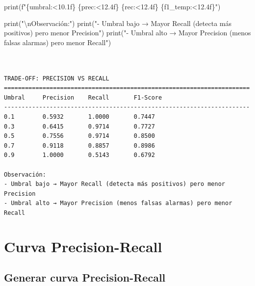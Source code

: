 \documentclass[
  doc,
  floatsintext,
  longtable,
  a4paper,
  nolmodern,
  notxfonts,
  notimes,
  12pt,
  colorlinks=true,linkcolor=blue,citecolor=blue,urlcolor=blue]{apa7}
\newenvironment{Shaded}{\begin{snugshade}}{\end{snugshade}}
\newcommand{\BuiltInTok}[1]{\textcolor[rgb]{0.00,0.23,0.31}{#1}}
\newcommand{\CharTok}[1]{\textcolor[rgb]{0.13,0.47,0.30}{#1}}
\newcommand{\NormalTok}[1]{\textcolor[rgb]{0.00,0.23,0.31}{#1}}
\newcommand{\SpecialCharTok}[1]{\textcolor[rgb]{0.37,0.37,0.37}{#1}}
\newcommand{\SpecialStringTok}[1]{\textcolor[rgb]{0.13,0.47,0.30}{#1}}
\newcommand{\StringTok}[1]{\textcolor[rgb]{0.13,0.47,0.30}{#1}}
\begin{document}
\begin{Shaded}
\begin{Highlighting}[]
    \BuiltInTok{print}\NormalTok{(}\SpecialStringTok{f"}\SpecialCharTok{\{}\NormalTok{umbral}\SpecialCharTok{:\textless{}10.1f\}}\SpecialStringTok{ }\SpecialCharTok{\{}\NormalTok{prec}\SpecialCharTok{:\textless{}12.4f\}}\SpecialStringTok{ }\SpecialCharTok{\{}\NormalTok{rec}\SpecialCharTok{:\textless{}12.4f\}}\SpecialStringTok{ }\SpecialCharTok{\{}\NormalTok{f1\_temp}\SpecialCharTok{:\textless{}12.4f\}}\SpecialStringTok{"}\NormalTok{)}

\BuiltInTok{print}\NormalTok{(}\StringTok{"}\CharTok{\textbackslash{}n}\StringTok{Observación:"}\NormalTok{)}
\BuiltInTok{print}\NormalTok{(}\StringTok{"{-} Umbral bajo → Mayor Recall (detecta más positivos) pero menor Precision"}\NormalTok{)}
\BuiltInTok{print}\NormalTok{(}\StringTok{"{-} Umbral alto → Mayor Precision (menos falsas alarmas) pero menor Recall"}\NormalTok{)}
\end{Highlighting}
\end{Shaded}

\begin{verbatim}


TRADE-OFF: PRECISION VS RECALL
======================================================================
Umbral     Precision    Recall       F1-Score    
----------------------------------------------------------------------
0.1        0.5932       1.0000       0.7447      
0.3        0.6415       0.9714       0.7727      
0.5        0.7556       0.9714       0.8500      
0.7        0.9118       0.8857       0.8986      
0.9        1.0000       0.5143       0.6792      

Observación:
- Umbral bajo → Mayor Recall (detecta más positivos) pero menor Precision
- Umbral alto → Mayor Precision (menos falsas alarmas) pero menor Recall
\end{verbatim}

\section{Curva Precision-Recall}\label{curva-precision-recall}

\subsection{Generar curva
Precision-Recall}\label{generar-curva-precision-recall}
\end{document}
